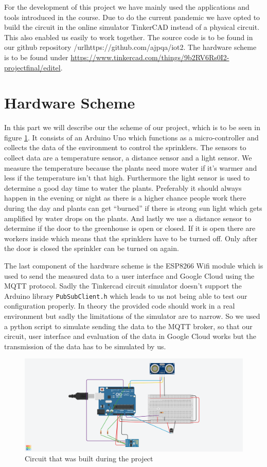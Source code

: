 \documentclass{article}
\begin{document}
For the development of this project we have mainly used the applications and tools introduced in the course. Due to do the current pandemic we have opted to build the circuit in the online simulator TinkerCAD instead of a physical circuit. This also enabled us easily to work together. The source code is to be found in our github repository /url{https://github.com/ajpqa/iot2}. The hardware scheme is to be found under \url{https://www.tinkercad.com/things/9b2RV6Rs0I2-projectfinal/editel}.

\section{Hardware Scheme}
In this part we will describe our the scheme of our project, which is to be seen in figure \ref{fig:scheme}. It consists of an Arduino Uno which functions as a micro-controller and collects the data of the environment to control the sprinklers. The sensors to collect data are a temperature sensor, a distance sensor and a light sensor. We measure the temperature because the plants need more water if it's warmer and less if the temperature isn't that high. Furthermore the light sensor is used to determine a good day time to water the plants. Preferably it should always happen in the evening or night as there is a higher chance people work there during the day and plants can get \enquote{burned} if there is strong sun light which gets amplified by water drops on the plants. And lastly we use a distance sensor to determine if the door to the greenhouse is open or closed. If it is open there are workers inside which means that the sprinklers have to be turned off. Only after the door is closed the sprinkler can be turned on again.\par 
The last component of the hardware scheme is the ESP8266 Wifi module which is used to send the measured data to a user interface and Google Cloud using the MQTT protocol. Sadly the Tinkercad circuit simulator doesn't support the Arduino library \texttt{PubSubClient.h} which leads to us not being able to test our configuration properly. In theory the provided code should work in a real environment but sadly the limitations of the simulator are to narrow. So we used a python script to simulate sending the data to the MQTT broker, so that our circuit, user interface and evaluation of the data in Google Cloud works but the transmission of the data has to be simulated by us. 
\begin{figure}
    \centering
	\hspace*{-4cm}\includegraphics[scale=0.3]{scheme.png}
	\caption{Circuit that was built during the project}
	\label{fig:scheme}
\end{figure}
\end{document}
